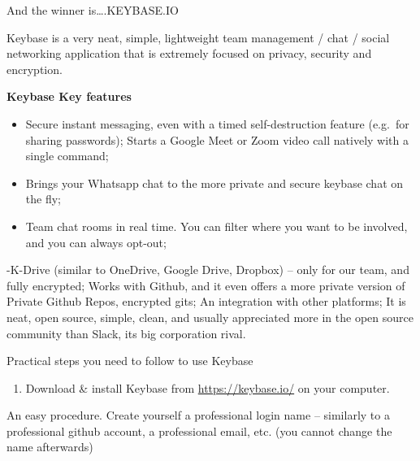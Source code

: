 \documentclass[
  a4paper,
  openany, a4paper, oneside]{book}
\providecommand{\tightlist}{%
  \setlength{\itemsep}{0pt}\setlength{\parskip}{0pt}}
\begin{document}
And the winner is\ldots.KEYBASE.IO

Keybase is a very neat, simple, lightweight team management / chat / social networking application that is extremely focused on privacy, security and encryption.

\textbf{Keybase Key features}

\begin{itemize}
\item
  Secure instant messaging, even with a timed self-destruction feature (e.g.~for sharing passwords);
  Starts a Google Meet or Zoom video call natively with a single command;
\item
  Brings your Whatsapp chat to the more private and secure keybase chat on the fly;
\item
  Team chat rooms in real time. You can filter where you want to be involved, and you can always opt-out;
\end{itemize}

-K-Drive (similar to OneDrive, Google Drive, Dropbox) -- only for our team, and fully encrypted;
Works with Github, and it even offers a more private version of Private Github Repos, encrypted gits;
An integration with other platforms;
It is neat, open source, simple, clean, and usually appreciated more in the open source community than Slack, its big corporation rival.

Practical steps you need to follow to use Keybase

\begin{enumerate}
\def\labelenumi{\arabic{enumi}.}
\tightlist
\item
  Download \& install Keybase from \url{https://keybase.io/} on your computer.
\end{enumerate}

An easy procedure. Create yourself a professional login name -- similarly to a professional github account, a professional email, etc. (you cannot change the name afterwards)
\end{document}
